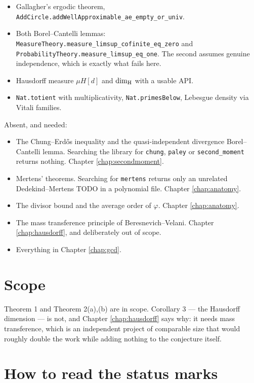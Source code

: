 \begin{itemize}
  \item Gallagher's ergodic theorem, \texttt{AddCircle.addWellApproximable\_ae\_empty\_or\_univ}.
  \item Both Borel--Cantelli lemmas: \texttt{MeasureTheory.measure\_limsup\_cofinite\_eq\_zero}
    and \texttt{ProbabilityTheory.measure\_limsup\_eq\_one}. The second assumes genuine
    independence, which is exactly what fails here.
  \item Hausdorff measure $\mu H[d]$ and $\dim_{\mathrm H}$ with a usable API.
  \item \texttt{Nat.totient} with multiplicativity, \texttt{Nat.primesBelow}, Lebesgue
    density via Vitali families.
\end{itemize}

Absent, and needed:

\begin{itemize}
  \item The Chung--Erd\H{o}s inequality and the quasi-independent divergence
    Borel--Cantelli lemma. Searching the library for \texttt{chung}, \texttt{paley} or
    \texttt{second\_moment} returns nothing. Chapter \ref{chap:secondmoment}.
  \item Mertens' theorems. Searching for \texttt{mertens} returns only an unrelated
    Dedekind--Mertens TODO in a polynomial file. Chapter \ref{chap:anatomy}.
  \item The divisor bound and the average order of $\varphi$. Chapter \ref{chap:anatomy}.
  \item The mass transference principle of Beresnevich--Velani. Chapter
    \ref{chap:hausdorff}, and deliberately out of scope.
  \item Everything in Chapter \ref{chap:gcd}.
\end{itemize}

\section*{Scope}

Theorem 1 and Theorem 2(a),(b) are in scope. Corollary 3 --- the Hausdorff dimension
--- is not, and Chapter \ref{chap:hausdorff} says why: it needs mass transference,
which is an independent project of comparable size that would roughly double the work
while adding nothing to the conjecture itself.

\section*{How to read the status marks}

